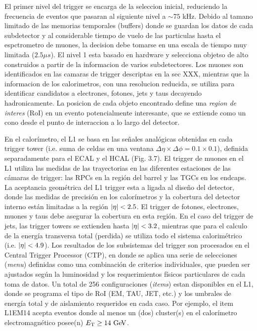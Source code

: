 El primer nivel del trigger se encarga de la seleccion inicial, reduciendo la frecuencia
de eventos que pasaran al siguiente nivel a $\sim 75$ kHz. Debido al tamano limitado
de las memorias temporales (buffers) donde se guardan los datos de cada subdetector y al
considerable tiempo de vuelo de las particulas hasta el espctrometro de muones, la decision
debe tomarse en una escala de tiempo muy limitada ($2.5 \mu s$). El nivel 1 esta basado
en hardware y selecciona objetso de alto {\pt} construidos a partir de la informacion
de varios subdetectores. Los muones son identificados en las camaras de trigger descriptas
en la sec XXX, mientras que la informacion de los calorimetros, con una resolucion reducida,
se utiliza para identificar candidatos a electrones, fotones, jets y taus decayendo
hadronicamente. La posicion de cada objeto encontrado define una \emph{region de interes}
(RoI) en un evento potencialmente interesante, que se extiende como un cono desde el punto de
interaccion a lo largo del detector.

En el calorímetro, el L1 se basa en las se\~nales analógicas obtenidas en cada trigger
tower (i.e. suma de celdas en una ventana $\Delta \eta \times \Delta \phi = 0.1 \times 0.1$),
definida separadamente para el ECAL y el HCAL (Fig. 3.7). El trigger de muones en el L1 utiliza las medidas de
las trayectorias en las diferentes estaciones de las cámaras de trigger: las RPCs en la región
del barrel y las TGCs en los endcaps. La aceptancia geométrica del L1 trigger esta a ligada
al dise\~no del detector, donde las medidas de precisión en los calorímetros y la cobertura
del detector interno están limitadas a la región $\abseta < 2.5$. El trigger de fotones, electrones,
muones y taus debe asegurar la cobertura en esta región. En el caso del trigger de jets,
las trigger towers se extienden hasta $\abseta < 3.2$, mientras que para el calculo de la energía
transversa total (perdida) se utiliza todo el sistema calorimétrico (i.e. $\abseta < 4.9$).
Los resultados de los subsistemas del trigger son procesados en el Central Trigger Processor
(CTP), en donde se aplica una serie de selecciones (\emph{menu}) definidas como una
combinación de criterios individuales, que pueden ser ajustados según la luminosidad y los
requerimientos físicos particulares de cada toma de datos. Un total de 256 configuraciones
(\emph{items}) estan disponibles en el L1, donde se programa el tipo de RoI (EM, TAU, JET, etc.)
y los umbrales de energía total y de aislamiento requeridos en cada caso. Por ejemplo,
el  item L1EM14 acepta eventos donde al menos un (dos) cluster(s) en el calorímetro
electromagnético posee(n) $\et \geq 14 \GeV$.

